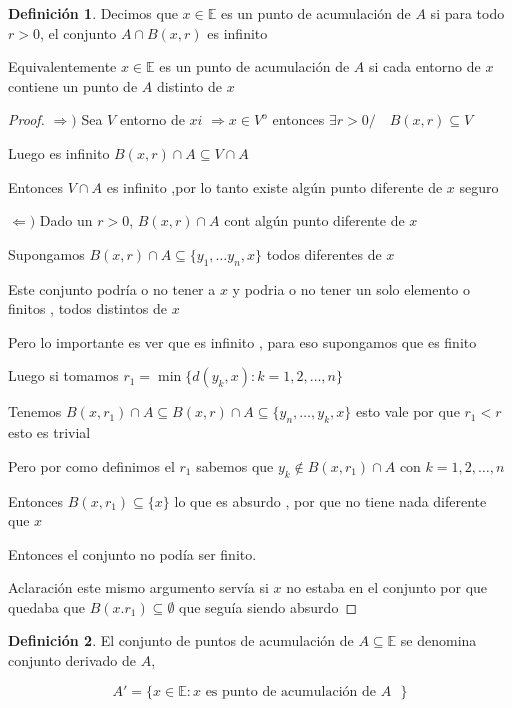 \documentclass[12pt]{article}
\newcommand{\E}{\mathbb{E}}
\newcommand{\Ra}{\Rightarrow}
\newcommand{\open}{\mathrm{o}}
\theoremstyle{definition}
\newtheorem{definition}{Definición}[section]
\begin{document}
\begin{definition}
  Decimos que $x \in \E$ es un punto de acumulación de $A$ si para todo $r > 0$, el conjunto $A \cap B(x,r)$ es infinito
  
  Equivalentemente $x \in \E$ es un punto de acumulación de $A$ si cada entorno de $x$ contiene un punto de $A$ distinto de $x$

  \begin{proof}
  $\Ra ) $ Sea $V$ entorno de $xi$ $ \Ra x \in V^{\open}$ entonces  $\exists r>0 / \quad B(x,r) \subseteq V$

  Luego es infinito $B(x,r) \cap A \subseteq V \cap A$

  Entonces $V \cap A$ es infinito ,por lo tanto existe algún punto diferente de $x$ seguro
  
$\Leftarrow ) $ Dado un $r>0$, $B(x,r) \cap A$ cont algún punto diferente de $x$

Supongamos $B(x,r) \cap A \subseteq \{y_{1}, \dots y_{n},x\}$ todos diferentes de $x$

Este conjunto podría o no tener a $x$ y podria o no tener un solo elemento o finitos , todos distintos de $x$

Pero lo importante es ver que es infinito , para eso supongamos que es finito 

Luego si tomamos $r_{1} = \min \{d(y_{k},x) : k = 1,2,\dots,n\}$ 

Tenemos $B(x,r_{1}) \cap A \subseteq B(x,r) \cap A \subseteq \{y_{n}, \dots ,y_{k},x\}$ esto vale por que $r_{1} < r$ esto es trivial

Pero por como definimos el $r_{1}$ sabemos que $y_{k} \notin B(x,r_{1}) \cap A$ con $k = 1,2,\dots,n$

Entonces $B(x,r_{1}) \subseteq \{x\}$ lo que es absurdo , por que no tiene nada diferente que $x$

Entonces el conjunto no podía ser finito. 

Aclaración este mismo argumento servía si $x$ no estaba en el conjunto por que quedaba que $B(x.r_{1}) \subseteq \emptyset$ que seguía siendo absurdo
\end{proof}
\end{definition}

\begin{definition}
  El conjunto de puntos de acumulación de $A \subseteq \E$ se denomina conjunto derivado de $A$,

 $$ A' = \{x \in \E : x \text{ es punto de acumulación de $A$ }\}$$
\end{definition}
\end{document}
